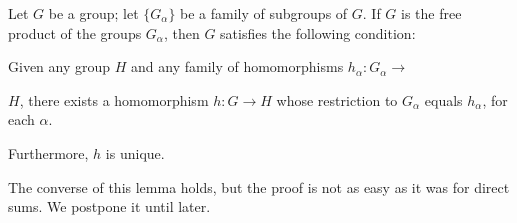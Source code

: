 \begin{lemma}
\label{lem:\thetheorem}
Let \(G\) be a group; let \(\{ G_{\alpha }\}\) be a family of subgroups of \(G\). If \(G\) is the free product of the groups \(G_{\alpha }\), then \(G\) satisfies the following condition:

Given any group \(H\) and any family of homomorphisms \(h_{\alpha } : G_{\alpha } \rightarrow\)

\(H\), there exists a homomorphism \(h : G \rightarrow H\) whose restriction to \(G_{\alpha }\) equals \(h_{\alpha }\), for each \(\alpha\).

Furthermore, \(h\) is unique.

The converse of this lemma holds, but the proof is not as easy as it was for direct sums. We postpone it until later.
\end{lemma}

